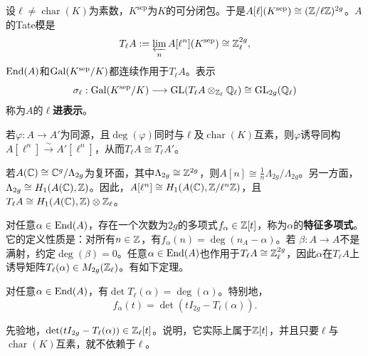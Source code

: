 设$\ell\ne\operatorname{char}(K)$为素数，$K^{\mathrm{sep}}$为$K$的可分闭包。于是$A[\ell](K^{\mathrm{sep}})\cong(\mathbb{Z}/\ell\mathbb{Z})^{2g}$。$A$的Tate模是
\[T_\ell A:=\varprojlim_n A[\ell^n](K^{\mathrm{sep}})\cong\mathbb{Z}_\ell^{2g},\]
$\operatorname{End}(A)$和$\operatorname{Gal}(K^{\mathrm{sep}}/K)$都连续作用于$T_\ell A$。表示
\[\sigma_\ell:\operatorname{Gal}(K^{\mathrm{sep}}/K)\longrightarrow\operatorname{GL}(T_\ell A\otimes_{\mathbb{Z}_\ell}\mathbb{Q}_\ell)\cong\operatorname{GL}_{2g}(\mathbb{Q}_\ell)\]
称为$A$的\textbf{$\ell$进表示}。
\begin{note}[L7S2O2]
若$\varphi:A\to A'$为同源，且$\deg(\varphi)$同时与$\ell$及$\operatorname{char}(K)$互素，则$\varphi$诱导同构$A[\ell^n]\xrightarrow{\sim}A'[\ell^n]$，从而$T_\ell A\cong T_\ell A'$。
\end{note}
\begin{note}[L7S2O3]
若$A(\mathbb{C})\cong\mathbb{C}^g/\Lambda_{2g}$为复环面，其中$\Lambda_{2g}\cong\mathbb{Z}^{2g}$，则$A[n]\cong\frac1n\Lambda_{2g}/\Lambda_{2g}$。另一方面，$\Lambda_{2g}\cong H_1(A(\mathbb{C}),\mathbb{Z})$。因此，$A[\ell^n]\cong H_1(A(\mathbb{C}),\mathbb{Z}/\ell^n\mathbb{Z})$，且$T_\ell A\cong H_1(A(\mathbb{C}),\mathbb{Z})\otimes\mathbb{Z}_\ell$。
\end{note}
对任意$\alpha\in\operatorname{End}(A)$，存在一个次数为$2g$的多项式$f_\alpha\in\mathbb{Z}[t]$，称为$\alpha$的\textbf{特征多项式}。它的定义性质是：对所有$n\in\mathbb{Z}$，有$f_\alpha(n)=\deg(n_A-\alpha)$。若
$\beta:A\to A$不是满射，约定$\deg(\beta)=0$。任意$\alpha\in\operatorname{End}(A)$也作用于$T_\ell A\cong\mathbb{Z}_\ell^{2g}$，因此$\alpha$在$T_\ell A$上诱导矩阵$T_\ell(\alpha)\in M_{2g}(\mathbb{Z}_\ell)$。有如下定理。
\begin{theorem}\label{L7S2O4}
对任意$\alpha\in\operatorname{End}(A)$，有$\det T_\ell(\alpha)=\deg(\alpha)$。特别地，
\[f_\alpha(t)=\det(tI_{2g}-T_\ell(\alpha)).\]
\end{theorem}
\begin{note}[L7S2O5]
先验地，$\det(tI_{2g}-T_\ell(\alpha))\in\mathbb{Z}_\ell[t]$。说明，它实际上属于$\mathbb{Z}[t]$，并且只要$\ell$与$\operatorname{char}(K)$互素，就不依赖于$\ell$。
\end{note}
